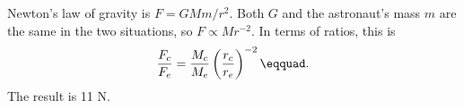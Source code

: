 Newton's law of gravity is $F=GMm/r^2$. Both $G$ and the astronaut's
mass $m$ are the same in the two situations, so
$F\propto Mr^{-2}$. In terms of ratios, this is
\begin{equation*}
  \frac{F_c}{F_e} = \frac{M_c}{M_e}\left(\frac{r_c}{r_e}\right)^{-2}\eqquad.
\end{equation*}
The result is 11 N.
